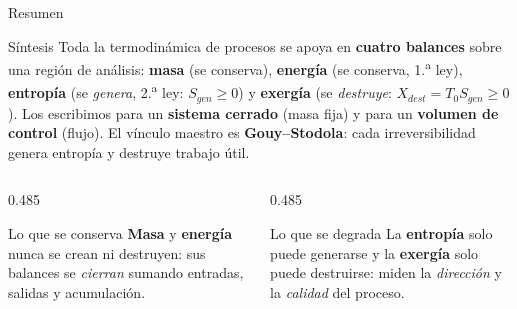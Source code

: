 \documentclass[aspectratio=169,10pt]{beamer}
\begin{document}
\begin{frame}{Resumen}
\begin{cardidea}{Síntesis}{\faLightbulb}
Toda la termodinámica de procesos se apoya en \textbf{cuatro balances} sobre una región de análisis: \textbf{masa} (se conserva), \textbf{energía} (se conserva, 1.\textsuperscript{a} ley), \textbf{entropía} (se \emph{genera}, 2.\textsuperscript{a} ley: $S_{gen}\ge0$) y \textbf{exergía} (se \emph{destruye}: $X_{dest}=T_0S_{gen}\ge0$). Los escribimos para un \textbf{sistema cerrado} (masa fija) y para un \textbf{volumen de control} (flujo). El vínculo maestro es \textbf{Gouy--Stodola}: cada irreversibilidad genera entropía y destruye trabajo útil.
\end{cardidea}
\vspace{2mm}
\begin{columns}[T]
\begin{column}{0.485\textwidth}
\begin{cardgear}{Lo que se conserva}{\faCogs}
\textbf{Masa} y \textbf{energía} nunca se crean ni destruyen: sus balances se \emph{cierran} sumando entradas, salidas y acumulación.
\end{cardgear}
\end{column}
\begin{column}{0.485\textwidth}
\begin{cardgear}{Lo que se degrada}{\faRecycle}
La \textbf{entropía} solo puede generarse y la \textbf{exergía} solo puede destruirse: miden la \emph{dirección} y la \emph{calidad} del proceso.
\end{cardgear}
\end{column}
\end{columns}
\end{frame}
\end{document}
